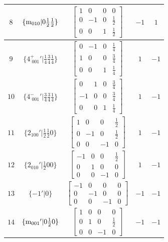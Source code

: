 \documentclass[fleqn,8pt]{jsarticle}
\begin{document}
\begin{longtable}{ccccc}
$ 8 $ & $ \{{\rm m}_{010}|0 \frac{1}{2} \frac{1}{2}\} $ & $ \begin{bmatrix} 1 & 0 & 0 & 0 \\ 0 & -1 & 0 & \frac{1}{2} \\ 0 & 0 & 1 & \frac{1}{2} \end{bmatrix} $ & $ -1 $ & $ 1 $ \\ \hline
$ 9 $ & $ \{4^{+}_{\,\,001}{}'|\frac{1}{4} \frac{3}{4} \frac{1}{4}\} $ & $ \begin{bmatrix} 0 & -1 & 0 & \frac{1}{4} \\ 1 & 0 & 0 & \frac{3}{4} \\ 0 & 0 & 1 & \frac{1}{4} \end{bmatrix} $ & $ 1 $ & $ -1 $ \\ \hline
$ 10 $ & $ \{4^{-}_{\,\,001}{}'|\frac{3}{4} \frac{3}{4} \frac{1}{4}\} $ & $ \begin{bmatrix} 0 & 1 & 0 & \frac{3}{4} \\ -1 & 0 & 0 & \frac{3}{4} \\ 0 & 0 & 1 & \frac{1}{4} \end{bmatrix} $ & $ 1 $ & $ -1 $ \\ \hline
$ 11 $ & $ \{2{}_{100}{}'|\frac{1}{2} \frac{1}{2} 0\} $ & $ \begin{bmatrix} 1 & 0 & 0 & \frac{1}{2} \\ 0 & -1 & 0 & \frac{1}{2} \\ 0 & 0 & -1 & 0 \end{bmatrix} $ & $ 1 $ & $ -1 $ \\ \hline
$ 12 $ & $ \{2{}_{010}{}'|\frac{1}{2} 0 0\} $ & $ \begin{bmatrix} -1 & 0 & 0 & \frac{1}{2} \\ 0 & 1 & 0 & 0 \\ 0 & 0 & -1 & 0 \end{bmatrix} $ & $ 1 $ & $ -1 $ \\ \hline
$ 13 $ & $ \{-1{}'|0\} $ & $ \begin{bmatrix} -1 & 0 & 0 & 0 \\ 0 & -1 & 0 & 0 \\ 0 & 0 & -1 & 0 \end{bmatrix} $ & $ -1 $ & $ -1 $ \\ \hline
$ 14 $ & $ \{{\rm m}_{001}{}'|0 \frac{1}{2} 0\} $ & $ \begin{bmatrix} 1 & 0 & 0 & 0 \\ 0 & 1 & 0 & \frac{1}{2} \\ 0 & 0 & -1 & 0 \end{bmatrix} $ & $ -1 $ & $ -1 $ \\ \hline

\end{longtable}
\end{document}
